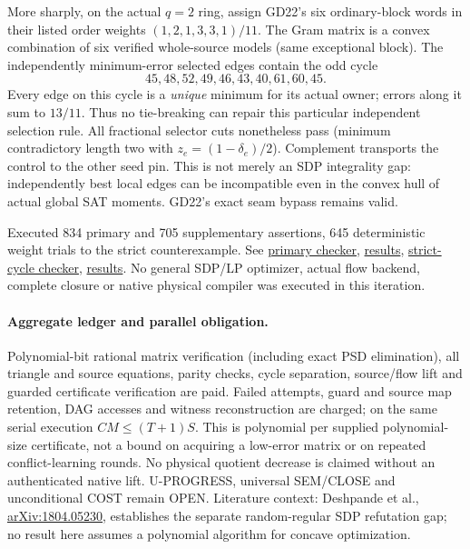 \documentclass[11pt]{article}
\begin{document}
More sharply, on the actual $q=2$ ring, assign GD22's six ordinary-block words in their listed order weights $(1,2,1,3,3,1)/11$. The Gram matrix is a convex combination of six verified whole-source models (same exceptional block). The independently minimum-error selected edges contain the odd cycle
\[
45,48,52,49,46,43,40,61,60,45.
\]
Every edge on this cycle is a \emph{unique} minimum for its actual owner; errors along it sum to $13/11$. Thus no tie-breaking can repair this particular independent selection rule. All fractional selector cuts nonetheless pass (minimum contradictory length two with $z_e=(1-\delta_e)/2$). Complement transports the control to the other seed pin. This is not merely an SDP integrality gap: independently best local edges can be incompatible even in the convex hull of actual global SAT moments. GD22's exact seam bypass remains valid.

Executed 834 primary and 705 supplementary assertions, 645 deterministic weight trials to the strict counterexample. See \href{https://github.com/j15marti/pnp/commit/af3db80de39dd7b5afae06ca361c15577278950e}{primary checker}, \href{https://github.com/j15marti/pnp/commit/da3b6eb497aac2252339a8fd560a974d25bdfedd}{results}, \href{https://github.com/j15marti/pnp/commit/460d399e099a81404d36eb00be1c0aea28e84217}{strict-cycle checker}, \href{https://github.com/j15marti/pnp/commit/75dcc7cbb7fa3d34b83b23ef530f523c5ca6cea7}{results}. No general SDP/LP optimizer, actual flow backend, complete closure or native physical compiler was executed in this iteration.

\paragraph{Aggregate ledger and parallel obligation.}
Polynomial-bit rational matrix verification (including exact PSD elimination), all triangle and source equations, parity checks, cycle separation, source/flow lift and guarded certificate verification are paid. Failed attempts, guard and source map retention, DAG accesses and witness reconstruction are charged; on the same serial execution $CM\le(T+1)S$. This is polynomial per supplied polynomial-size certificate, not a bound on acquiring a low-error matrix or on repeated conflict-learning rounds. No physical quotient decrease is claimed without an authenticated native lift. U-PROGRESS, universal SEM/CLOSE and unconditional COST remain OPEN. Literature context: Deshpande et al., \href{https://arxiv.org/abs/1804.05230}{arXiv:1804.05230}, establishes the separate random-regular SDP refutation gap; no result here assumes a polynomial algorithm for concave optimization.
\end{document}
